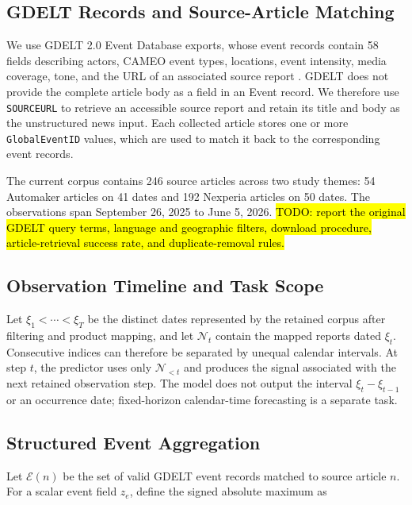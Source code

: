 \documentclass[letterpaper]{article} %
\begin{document}
\subsection{GDELT Records and Source-Article Matching}

We use GDELT 2.0 Event Database exports, whose event records contain 58 fields describing actors, CAMEO event types, locations, event intensity, media coverage, tone, and the URL of an associated source report \cite{leetaru2013gdelt,gdelt2015eventcodebook}. GDELT does not provide the complete article body as a field in an Event record. We therefore use \texttt{SOURCEURL} to retrieve an accessible source report and retain its title and body as the unstructured news input. Each collected article stores one or more \texttt{GlobalEventID} values, which are used to match it back to the corresponding event records.

The current corpus contains 246 source articles across two study themes: 54 Automaker articles on 41 dates and 192 Nexperia articles on 50 dates. The observations span September 26, 2025 to June 5, 2026. \hl{TODO: report the original GDELT query terms, language and geographic filters, download procedure, article-retrieval success rate, and duplicate-removal rules.}

\subsection{Observation Timeline and Task Scope}
\label{app:timeline}

Let \(\xi_1<\cdots<\xi_T\) be the distinct dates represented by the retained corpus after filtering and product mapping, and let \(\mathcal N_t\) contain the mapped reports dated \(\xi_t\). Consecutive indices can therefore be separated by unequal calendar intervals. At step \(t\), the predictor uses only \(\mathcal N_{<t}\) and produces the signal associated with the next retained observation step. The model does not output the interval \(\xi_t-\xi_{t-1}\) or an occurrence date; fixed-horizon calendar-time forecasting is a separate task.

\subsection{Structured Event Aggregation}

Let \(\mathcal E(n)\) be the set of valid GDELT event records matched to source article \(n\). For a scalar event field \(z_e\), define the signed absolute maximum as
\end{document}
